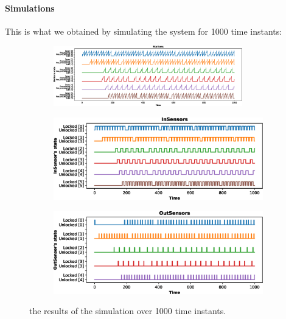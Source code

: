 \documentclass[a4paper]{article}
\begin{document}
    \paragraph{Simulations} This is what we obtained by simulating the system for 1000 time instants:

    \begin{figure}[h!]
        \begin{subfigure}{\textwidth}
            \centering
            \includegraphics[width=0.9\textwidth]{images/scenarios/scenario1_stations}
        \end{subfigure}
        \begin{subfigure}{0.49\textwidth}
            \centering
            \includegraphics[width=\textwidth]{images/scenarios/scenario1_insensors}
        \end{subfigure}
        \hfill
        \begin{subfigure}{0.49\textwidth}
            \centering
            \includegraphics[width=\textwidth]{images/scenarios/scenario1_outsensors}
        \end{subfigure}
        \caption{the results of the simulation over 1000 time instants.}
    \end{figure}
\end{document}
